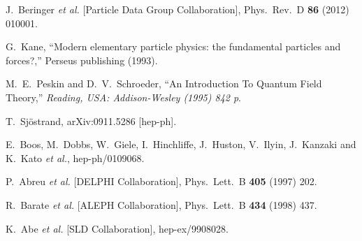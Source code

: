 \documentclass{tesisusb} %
\begin{document}
\begin{onehalfspace}
\begin{thebibliography}{99}
  J.~Beringer {\it et al.}  [Particle Data Group Collaboration],
  Phys.\ Rev.\ D {\bf 86} (2012) 010001.

 G.~Kane,
 ``Modern elementary particle physics: the fundamental particles and forces?,''
 Perseus publishing (1993).

  M.~E.~Peskin and D.~V.~Schroeder,
  ``An Introduction To Quantum Field Theory,''
{\it  Reading, USA: Addison-Wesley (1995) 842 p}.

  T.~Sjöstrand,
  arXiv:0911.5286 [hep-ph].

  E.~Boos, M.~Dobbs, W.~Giele, I.~Hinchliffe, J.~Huston, V.~Ilyin, J.~Kanzaki and K.~Kato {\it et al.},
  hep-ph/0109068.


  P.~Abreu {\it et al.}  [DELPHI Collaboration],
  Phys.\ Lett.\ B {\bf 405} (1997) 202.
  
  R.~Barate {\it et al.}  [ALEPH Collaboration],
  Phys.\ Lett.\ B {\bf 434} (1998) 437.
  
  K.~Abe {\it et al.}  [SLD Collaboration],
  hep-ex/9908028.
  

\end{thebibliography}
\end{onehalfspace}
\end{document}
